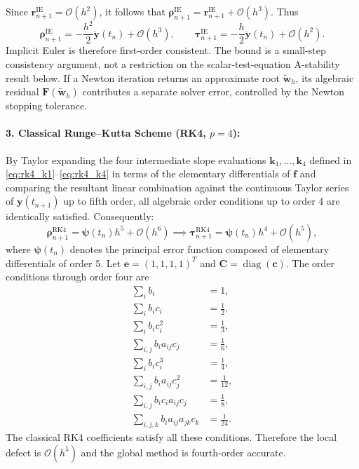 \documentclass[11pt,a4paper]{article}
\theoremstyle{definition}
\theoremstyle{remark}
\begin{document}
Since $\mathbf r_{n+1}^{\mathrm{IE}}=\mathcal O(h^2)$, it follows that $\boldsymbol\rho_{n+1}^{\mathrm{IE}}=\mathbf r_{n+1}^{\mathrm{IE}}+\mathcal O(h^3)$. Thus
\begin{equation}
\label{eq:ie_defect_expansion}
\boldsymbol\rho_{n+1}^{\mathrm{IE}}
=-\frac{h^2}{2}\ddot{\mathbf y}(t_n)+\mathcal O(h^3),
\qquad
\boldsymbol\tau_{n+1}^{\mathrm{IE}}
=-\frac{h}{2}\ddot{\mathbf y}(t_n)+\mathcal O(h^2).
\end{equation}
Implicit Euler is therefore first-order consistent. The bound is a small-step consistency argument, not a restriction on the scalar-test-equation A-stability result below. If a Newton iteration returns an approximate root $\widetilde{\mathbf w}_h$, its algebraic residual $\mathbf F(\widetilde{\mathbf w}_h)$ contributes a separate solver error, controlled by the Newton stopping tolerance.

\paragraph{3. Classical Runge--Kutta Scheme (RK4, $p=4$):}
By Taylor expanding the four intermediate slope evaluations $\mathbf{k}_1, \dots, \mathbf{k}_4$ defined in \eqref{eq:rk4_k1}--\eqref{eq:rk4_k4} in terms of the elementary differentials of $\mathbf{f}$ and comparing the resultant linear combination against the continuous Taylor series of $\mathbf{y}(t_{n+1})$ up to fifth order, all algebraic order conditions up to order 4 are identically satisfied. Consequently:
\begin{equation}
\label{eq:rk4_defect}
\boldsymbol{\rho}_{n+1}^{\text{RK4}} = \boldsymbol{\psi}(t_n) h^5 + \mathcal{O}(h^6) \implies \boldsymbol{\tau}_{n+1}^{\text{RK4}} = \boldsymbol{\psi}(t_n) h^4 + \mathcal{O}(h^5),
\end{equation}
where $\boldsymbol{\psi}(t_n)$ denotes the principal error function composed of elementary differentials of order 5. Let $\mathbf{e}=(1,1,1,1)^T$ and $\mathbf{C}=\operatorname{diag}(\mathbf{c})$. The order conditions through order four are
\begin{align}
\sum_i b_i &= 1, \\
\sum_i b_i c_i &= \frac12, \\
\sum_i b_i c_i^2 &= \frac13, \\
\sum_{i,j} b_i a_{ij}c_j &= \frac16, \\
\sum_i b_i c_i^3 &= \frac14, \\
\sum_{i,j} b_i a_{ij}c_j^2 &= \frac1{12}, \\
\sum_{i,j} b_i c_i a_{ij}c_j &= \frac18, \\
\sum_{i,j,k} b_i a_{ij}a_{jk}c_k &= \frac1{24}.
\end{align}
The classical RK4 coefficients satisfy all these conditions. Therefore the local defect is $\mathcal{O}(h^5)$ and the global method is fourth-order accurate.
\end{document}

